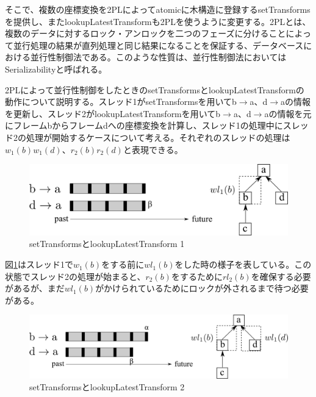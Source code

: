 \documentclass[a4paper]{jreport}	%
\begin{document}

そこで、複数の座標変換を2PLによってatomicに木構造に登録するsetTransformsを提供し、またlookupLatestTransformも2PLを使うように変更する。2PL\cite{2PL}とは、複数のデータに対するロック・アンロックを二つのフェーズに分けることによって並行処理の結果が直列処理と同じ結果になることを保証する、データベースにおける並行性制御法である。このような性質は、並行性制御法においてはSerializabilityと呼ばれる。


2PLによって並行性制御をしたときのsetTransformsとlookupLatestTransformの動作について説明する。スレッド1がsetTransformsを用いてb$\rightarrow$a、d$\rightarrow$aの情報を更新し、スレッド2がlookupLatestTransformを用いてb$\rightarrow$a、d$\rightarrow$aの情報を元にフレームbからフレームdへの座標変換を計算し、スレッド1の処理中にスレッド2の処理が開始するケースについて考える。それぞれのスレッドの処理は$w_1(b)w_1(d)$、$r_2(b)r_2(d)$と表現できる。

\begin{figure}[h] 
\centering
\includegraphics[width=12cm]{setTransforms1}
\caption{setTransformsとlookupLatestTransform 1}
\label{fig:setTransforms1}
\end{figure}

図\ref{fig:setTransforms1}はスレッド1で$w_1(b)$をする前に$wl_1(b)$をした時の様子を表している。この状態でスレッド2の処理が始まると、$r_2(b)$をするために$rl_2(b)$を確保する必要があるが、まだ$wl_1(b)$がかけられているためにロックが外されるまで待つ必要がある。

\begin{figure}[h] 
\centering
\includegraphics[width=12cm]{setTransforms2}
\caption{setTransformsとlookupLatestTransform 2}
\label{fig:setTransforms2}
\end{figure}
\end{document}
